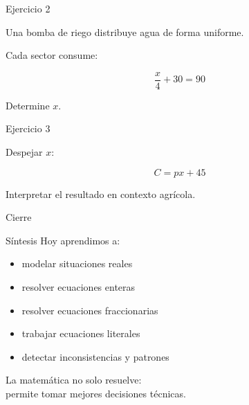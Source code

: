 \documentclass[aspectratio=169]{beamer}
\begin{document}
	\begin{frame}{Ejercicio 2}
		
		Una bomba de riego distribuye agua de forma uniforme.
		
		Cada sector consume:
		
		\[
		\frac{x}{4} + 30 = 90
		\]
		
		Determine \(x\).
		
	\end{frame}
	
	\begin{frame}{Ejercicio 3}
		
		Despejar \(x\):
		
		\[
		C = px + 45
		\]
		
		Interpretar el resultado en contexto agrícola.
		
	\end{frame}
	
	\begin{frame}{Cierre}
		
		\begin{block}{Síntesis}
			Hoy aprendimos a:
			
			\begin{itemize}
				\item modelar situaciones reales
				\item resolver ecuaciones enteras
				\item resolver ecuaciones fraccionarias
				\item trabajar ecuaciones literales
				\item detectar inconsistencias y patrones
			\end{itemize}
			
		\end{block}
		
		\begin{center}
			\Large
			La matemática no solo resuelve:\\
			permite tomar mejores decisiones técnicas.
		\end{center}
		
	\end{frame}
	
	
\end{document}
